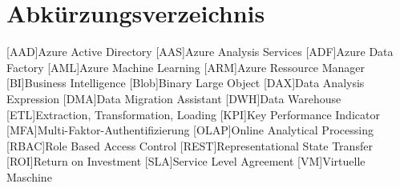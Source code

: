 \renewcommand{\chaptermark}[1]{\markboth{\spacedlowsmallcaps{#1}}{\spacedlowsmallcaps{#1}}}
\renewcommand{\sectionmark}[1]{\markright{\thesection\enspace\spacedlowsmallcaps{#1}}}
\chapter*{Abk\"{u}rzungsverzeichnis}

\begin{acronym}[OLAP]
    [AAD]{Azure Active Directory}
    [AAS]{Azure Analysis Services}
    [ADF]{Azure Data Factory}
    [AML]{Azure Machine Learning}
    [ARM]{Azure Ressource Manager}
    [BI]{Business Intelligence}
    [Blob]{Binary Large Object}
    [DAX]{Data Analysis Expression}
    [DMA]{Data Migration Assistant}
    [DWH]{Data Warehouse}
    [ETL]{Extraction, Transformation, Loading}
    [KPI]{Key Performance Indicator}
    [MFA]{Multi-Faktor-Authentifizierung}
    [OLAP]{Online Analytical Processing}
    [RBAC]{Role Based Access Control}
    [REST]{Representational State Transfer}
    [ROI]{Return on Investment}
    [SLA]{Service Level Agreement}
    [VM]{Virtuelle Maschine}
\end{acronym}
\cleardoublepage